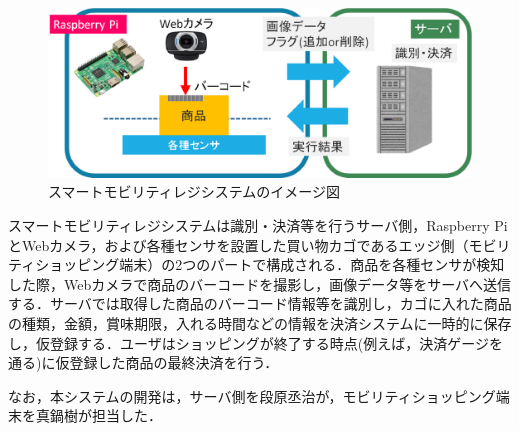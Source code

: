 \begin{figure}[htbp]
\centering
\includegraphics[width = 15cm]{./picture/summary2.eps}
\caption{スマートモビリティレジシステムのイメージ図}
\label{summary2}
\end{figure}


スマートモビリティレジシステムは識別・決済等を行うサーバ側，Raspberry PiとWebカメラ，および各種センサを設置した買い物カゴであるエッジ側（モビリティショッピング端末）の2つのパートで構成される．商品を各種センサが検知した際，Webカメラで商品のバーコードを撮影し，画像データ等をサーバへ送信する．サーバでは取得した商品のバーコード情報等を識別し，カゴに入れた商品の種類，金額，賞味期限，入れる時間などの情報を決済システムに一時的に保存し，仮登録する．ユーザはショッピングが終了する時点(例えば，決済ゲージを通る)に仮登録した商品の最終決済を行う．

なお，本システムの開発は，サーバ側を段原丞治が，モビリティショッピング端末を真鍋樹が担当した．